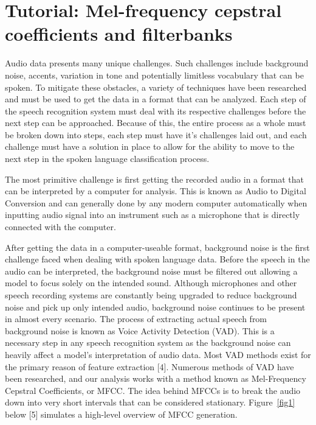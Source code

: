 \documentclass{llncs}
\begin{document}
\section{Tutorial: Mel-frequency cepstral coefficients and filterbanks}
Audio data presents many unique challenges. Such challenges include background noise, accents, variation in tone and potentially limitless vocabulary that can be spoken. To mitigate these obstacles, a variety of techniques have been researched and must be used to get the data in a format that can be analyzed. Each step of the speech recognition system must deal with its respective challenges before the next step can be approached. Because of this, the entire process as a whole must be broken down into steps, each step must have it’s challenges laid out, and each challenge must have a solution in place to allow for the ability to move to the next step in the spoken language classification process.

The most primitive challenge is first getting the recorded audio in a format that can be interpreted by a computer for analysis. This is known as Audio to Digital Conversion and can generally done by any modern computer automatically when inputting audio signal into an instrument such as a microphone that is directly connected with the computer.

After getting the data in a computer-useable format, background noise is the first challenge faced when dealing with spoken language data. Before the speech in the audio can be interpreted, the background noise must be filtered out allowing a model to focus solely on the intended sound. Although microphones and other speech recording systems are constantly being upgraded to reduce background noise and pick up only intended audio, background noise continues to be present in almost every scenario. The process of extracting actual speech from background noise is known as Voice Activity Detection (VAD). This is a necessary step in any speech recognition system as the background noise can heavily affect a model’s interpretation of audio data. Most VAD methods exist for the primary reason of feature extraction [4]. Numerous methods of VAD have been researched, and our analysis works with a method known as Mel-Frequency Cepstral Coefficients, or MFCC. The idea behind MFCCs is to break the audio down into very short intervals that can be considered stationary. Figure~\ref{fig1} below [5] simulates a high-level overview of MFCC generation.

\end{document}
